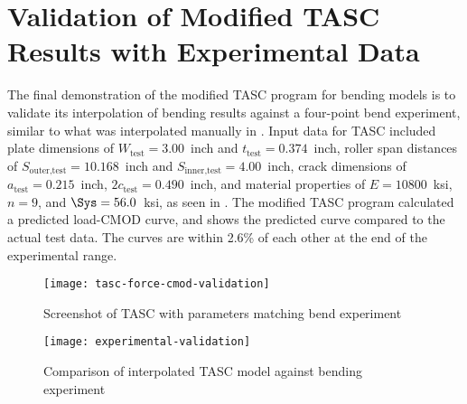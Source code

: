 \chapter{Validation of Modified TASC Results with Experimental Data} \label{chap:experiment-validation-tasc}

The final demonstration of the modified TASC program for bending models is to validate its interpolation of bending results against a four-point bend experiment, similar to what was interpolated manually in .
Input data for TASC included
plate dimensions of \(W_\text{test}=3.00\)~inch and \(t_\text{test}=0.374\)~inch,
roller span distances of \(S_\text{outer,test}=10.168\)~inch and \(S_\text{inner,test}=4.00\)~inch,
crack dimensions of \(a_\text{test}=0.215\)~inch, \(2c_\text{test}=0.490\)~inch,
and
material properties of \(E=10800\)~ksi, \(n=9\), and \(\Sys=56.0\)~ksi, as seen in .
The modified TASC program calculated a predicted load-CMOD curve, and  shows the predicted curve compared to the actual test data.
The curves are within 2.6\% of each other at the end of the experimental range.

\begin{figure}[tbp]
\centering
\texttt{[image: tasc-force-cmod-validation]}
\caption{\label{fig:tasc-force-cmod-validation} Screenshot of TASC with parameters matching bend experiment}
\end{figure}

\begin{figure}[tbp]
\centering
\texttt{[image: experimental-validation]}
\caption{\label{fig:experimental-validation} Comparison of interpolated TASC model against bending experiment}
\end{figure}

